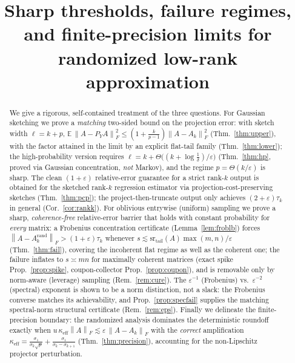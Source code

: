 \documentclass{amsart}
\theoremstyle{definition}
\newcommand{\Frob}[1]{\left\lVert #1\right\rVert_F}
\newcommand{\E}{\mathbb{E}}
\begin{document}
\title{Sharp thresholds, failure regimes, and finite-precision limits for
randomized low-rank approximation}
\maketitle

\begin{abstract}
We give a rigorous, self-contained treatment of the three questions. For
Gaussian sketching we prove a \emph{matching} two-sided bound on the projection
error: with sketch width $\ell=k+p$,
$\E\,\Frob{A-P_YA}^2\le(1+\tfrac{k}{p-1})\Frob{A-A_k}^2$
(Thm.~\ref{thm:upper}), with the factor attained in the limit by an explicit
flat-tail family (Thm.~\ref{thm:lower}); the high-probability version requires
$\ell=k+\Theta\big((k+\log\tfrac1\delta)/\varepsilon\big)$
(Thm.~\ref{thm:hp}, proved via Gaussian concentration, \emph{not} Markov), and
the regime $p=\Theta(k/\varepsilon)$ is sharp. The clean $(1+\varepsilon)$
relative-error guarantee for a strict rank-$k$ output is obtained for the
sketched rank-$k$ regression estimator via projection-cost-preserving sketches
(Thm.~\ref{thm:pcp}); the project-then-truncate output only achieves
$(2+\varepsilon)\tau_k$ in general (Cor.~\ref{cor:rankk}). For oblivious
entrywise (uniform) sampling we prove a sharp, \emph{coherence-free} relative-error
barrier that holds with constant probability for \emph{every} matrix: a Frobenius
concentration certificate (Lemma~\ref{lem:froblb}) forces
$\Frob{A-A_k^{\mathrm{rand}}}>(1+\varepsilon)\tau_k$ whenever
$s\lesssim\mathrm{sr}_{\mathrm{tail}}(A)\max(m,n)/\varepsilon$
(Thm.~\ref{thm:fail}), covering the incoherent flat regime as well as the
coherent one; the failure inflates to $s\asymp mn$ for maximally coherent
matrices (exact spike Prop.~\ref{prop:spike}, coupon-collector
Prop.~\ref{prop:coupon}), and is removable only by norm-aware (leverage) sampling
(Rem.~\ref{rem:cure}). The $\varepsilon^{-1}$ (Frobenius) vs.\ $\varepsilon^{-2}$
(spectral) exponent is shown to be a norm distinction, not a slack: the Frobenius
converse matches its achievability, and Prop.~\ref{prop:specfail} supplies the
matching spectral-norm structural certificate (Rem.~\ref{rem:eps}). Finally we delineate the finite-precision boundary: the
randomized analysis dominates the deterministic roundoff exactly when
$u\,\kappa_{\mathrm{eff}}\Frob{A}\lesssim\varepsilon\,\Frob{A-A_k}$ with the
\emph{correct} amplification
$\kappa_{\mathrm{eff}}=\frac{\sigma_1}{\sigma_k\sqrt p}+\frac{\sigma_1}{\sigma_k-\sigma_{k+1}}$
(Thm.~\ref{thm:precision}), accounting for the non-Lipschitz projector
perturbation.
\end{abstract}
\end{document}
